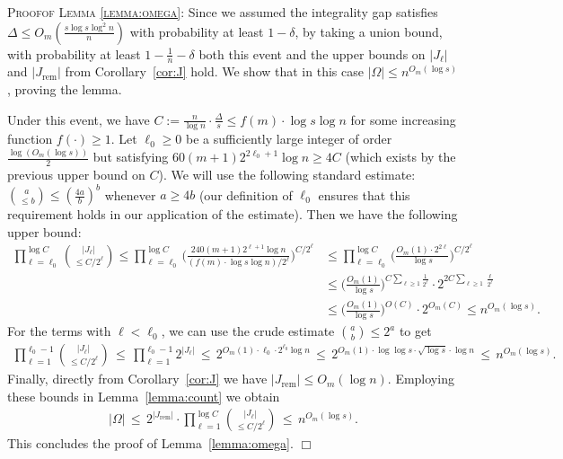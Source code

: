 \documentclass{article}
\newenvironment{proof}[1][]
   {\textsc{Proof#1: }}
   {\hfill$\Box$\smallskip}
\begin{document}
\begin{proof}[of Lemma \ref{lemma:omega}]
    Since we assumed the integrality gap satisfies $\Delta \le O_m(\frac{s \log s\log^2 n}{n})$ with probability at least $1 - \delta$, by taking a union bound, with probability at least $1 - \frac{1}{n} - \delta$ both this event and the upper bounds on $|J_\ell|$ and $|J_{\mathrm{rem}}|$ from Corollary~\ref{cor:J} hold. We show that in this case $|\Omega| \le n^{O_m(\log s)}$, proving the lemma.

    Under this event, we have $C := \frac{n}{\log n} \cdot \frac{\Delta}{s} \le f(m) \cdot \log s \log n$ for some increasing function $f(\cdot) \ge 1$. Let $\ell_0 \ge 0$ be a sufficiently large integer of order $\frac{\log(O_m(\log s))}{2}$ but satisfying $60 (m+1) 2^{2\ell_0 + 1} \log n \ge 4 C$ (which exists by the previous upper bound on $C$). We will use the following standard estimate: $\binom{a}{\le b} \le (\frac{4a}{b})^b$ whenever $a \ge 4b$ (our definition of $\ell_0$ ensures that this requirement holds in our application of the estimate). Then we have the following upper bound:
    \begin{align*}
        \prod_{\ell=\ell_0}^{\log C}
        \binom{|J_{\ell}|}{\le C/2^\ell} \le \prod_{\ell=\ell_0}^{\log C} \bigg(\frac{240 (m+1)2^{\ell+1} \log n}{(f(m) \cdot \log s \log n)/2^\ell} \bigg)^{C/2^\ell} &\le \prod_{\ell=\ell_0}^{\log C} \bigg(\frac{O_m(1) \cdot 2^{2\ell}}{\log s} \bigg)^{C/2^\ell}\\
        &\le \bigg(\frac{O_m(1)}{\log s} \bigg)^{C \sum_{\ell \ge 1} \frac{1}{2^\ell}} \cdot 2^{2C \sum_{\ell \ge 1} \frac{\ell}{2^\ell}}\\
        &\le \bigg(\frac{O_m(1)}{\log s} \bigg)^{O(C)} \cdot 2^{O_m(C)} \le n^{O_m(\log s)}.
    \end{align*}
    For the terms with $\ell < \ell_0$, we can use the crude estimate $\binom{a}{b} \le 2^a$ to get
    \begin{align*}
        \prod_{\ell=1}^{\ell_0 - 1}
        \binom{|J_{\ell}|}{\le C/2^\ell} \,\le\, \prod_{\ell = 1}^{\ell_0 - 1} 2^{|J_\ell|} \,\le\, 2^{O_m(1) \cdot \ell_0 \cdot 2^{\ell_0} \log n} \,\le\, 2^{O_m(1)\cdot \log \log s \cdot \sqrt{\log s} \cdot \log n} \,\le\, n^{O_m(\log s)}.
    \end{align*}
    Finally, directly from Corollary~\ref{cor:J} we have $|J_{\mathrm{rem}}| \le O_m(\log n)$. Employing these bounds in Lemma~\ref{lemma:count} we obtain
    \begin{align*}
        |\Omega| \,\le\, 2^{|J_{\mathrm{rem}}|} \cdot \prod_{\ell=1}^{\log C}
        \binom{|J_{\ell}|}{\le C/2^\ell} \,\le\, n^{O_m(\log s)}.
    \end{align*}
   This concludes the proof of Lemma~\ref{lemma:omega}.
\end{proof}
\end{document}
